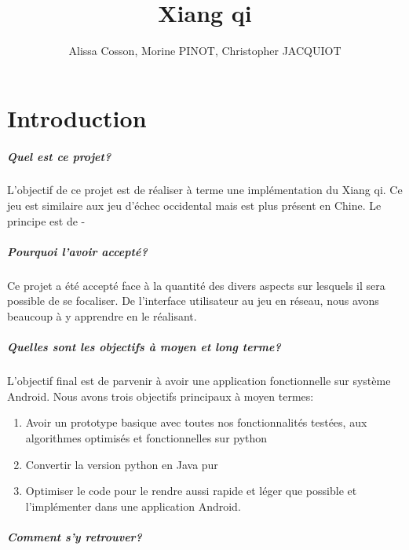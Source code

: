 \documentclass{scrreprt}
\title{\Huge \bfseries Xiang qi}
\author{Alissa Cosson, Morine PINOT, Christopher JACQUIOT}
\date{}
\begin{document}
\maketitle

\tableofcontents

\chapter{Introduction}
	\paragraph{Quel est ce projet?}
	
	L'objectif de ce projet est de réaliser à terme une implémentation du Xiang qi.
	Ce jeu est similaire aux jeu d'échec occidental mais est plus présent en Chine.
	Le principe est de -
	
	\paragraph{Pourquoi l'avoir accepté?} 
	
	Ce projet a été accepté face à la quantité des divers aspects sur lesquels il sera possible de se focaliser.
	De l'interface utilisateur au jeu en réseau, nous avons beaucoup à y apprendre en le réalisant.
	
	\paragraph{Quelles sont les objectifs à moyen et long terme?}
	
	L'objectif final est de parvenir à avoir une application fonctionnelle sur système Android.
	Nous avons trois objectifs principaux à moyen termes: 
	\begin{enumerate}
		\item 
		Avoir un prototype basique avec toutes nos fonctionnalités testées, aux algorithmes optimisés et fonctionnelles sur python
		
		\item 
		Convertir la version python en Java pur 
		
		\item 
		Optimiser le code pour le rendre aussi rapide et léger que possible et l'implémenter dans une application Android.
	\end{enumerate}
	
	\paragraph{Comment s'y retrouver?} 
	
\end{document}
